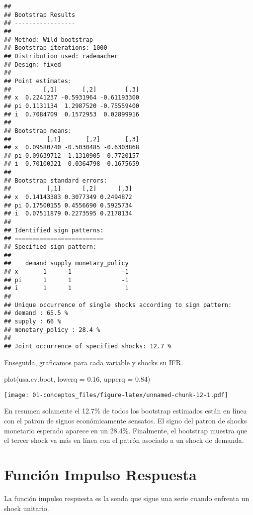 \documentclass[
]{book}
\newenvironment{Shaded}{\begin{snugshade}}{\end{snugshade}}
\newcommand{\AttributeTok}[1]{\textcolor[rgb]{0.77,0.63,0.00}{#1}}
\newcommand{\FloatTok}[1]{\textcolor[rgb]{0.00,0.00,0.81}{#1}}
\newcommand{\FunctionTok}[1]{\textcolor[rgb]{0.00,0.00,0.00}{#1}}
\newcommand{\NormalTok}[1]{#1}
\begin{document}
\begin{verbatim}
## 
## Bootstrap Results
## ----------------- 
## 
## Method: Wild bootstrap
## Bootstrap iterations: 1000
## Distribution used: rademacher
## Design: fixed
## 
## Point estimates: 
##         [,1]       [,2]        [,3]
## x  0.2241237 -0.5931964 -0.61193300
## pi 0.1131134  1.2987520 -0.75559400
## i  0.7084709  0.1572953  0.02899916
## 
## Bootstrap means: 
##          [,1]       [,2]       [,3]
## x  0.09580740 -0.5030485 -0.6303868
## pi 0.09639712  1.1310905 -0.7720157
## i  0.70100321  0.0364798 -0.1675659
## 
## Bootstrap standard errors: 
##          [,1]      [,2]      [,3]
## x  0.14143383 0.3077349 0.2494872
## pi 0.17500155 0.4556690 0.5925734
## i  0.07511879 0.2273595 0.2178134
## 
## Identified sign patterns: 
## =========================
## Specified sign pattern: 
## 
##    demand supply monetary_policy
## x       1     -1              -1
## pi      1      1              -1
## i       1      1               1
## 
## Unique occurrence of single shocks according to sign pattern: 
## demand : 65.5 % 
## supply : 66 % 
## monetary_policy : 28.4 % 
## 
## Joint occurrence of specified shocks: 12.7 %
\end{verbatim}

Enseguida, graficamos para cada variable y shocks su IFR.

\begin{Shaded}
\begin{Highlighting}[]
\FunctionTok{plot}\NormalTok{(usa.cv.boot, }\AttributeTok{lowerq =} \FloatTok{0.16}\NormalTok{, }\AttributeTok{upperq =} \FloatTok{0.84}\NormalTok{)}
\end{Highlighting}
\end{Shaded}

\texttt{[image: 01-conceptos\_files/figure-latex/unnamed-chunk-12-1.pdf]}

En resumen solamente el 12.7\% de todos los bootstrap estimados están en línea con el patron de signos económicamente sensatos.
El signo del patron de shocks monetario esperado aparece en un 28.4\%. Finalmente, el bootstrap muestra que el tercer shock va más en línea con el patrón asociado a un shock de demanda.

\hypertarget{funciuxf3n-impulso-respuesta-1}{%
\section{Función Impulso Respuesta}\label{funciuxf3n-impulso-respuesta-1}}

La función impulso respuesta es la senda que sigue una serie cuando enfrenta un shock unitario.
\end{document}
